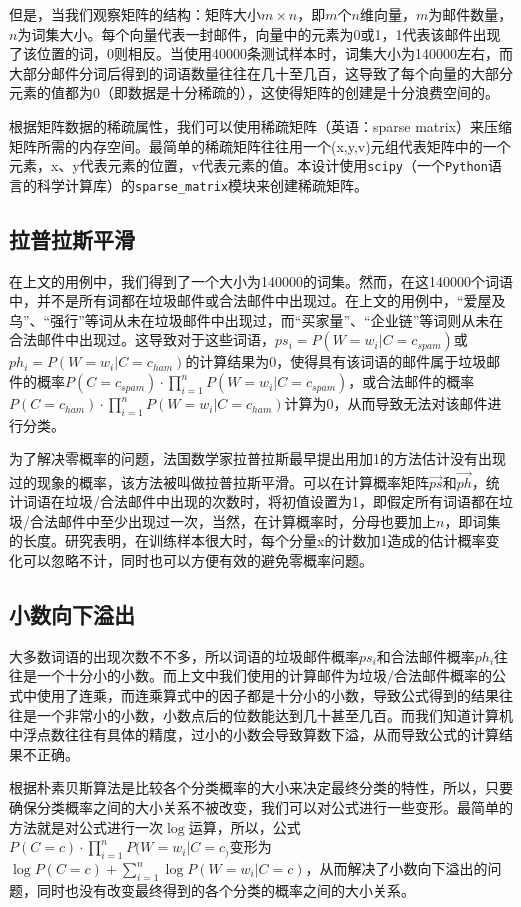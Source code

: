 \documentclass[UTF8,zihao=-4]{ctexart}
\newcommand{\upcite}[1]{\textsuperscript{\cite{#1}}}
\begin{document}
	但是，当我们观察矩阵的结构：矩阵大小$m\times n$，即$m$个$n$维向量，$m$为邮件数量，$n$为词集大小。每个向量代表一封邮件，向量中的元素为0或1，1代表该邮件出现了该位置的词，0则相反。当使用40000条测试样本时，词集大小为140000左右，而大部分邮件分词后得到的词语数量往往在几十至几百，这导致了每个向量的大部分元素的值都为0（即数据是十分稀疏的），这使得矩阵的创建是十分浪费空间的。
	
	根据矩阵数据的稀疏属性，我们可以使用稀疏矩阵（英语：sparse matrix）来压缩矩阵所需的内存空间。最简单的稀疏矩阵往往用一个(x,y,v)元组代表矩阵中的一个元素，x、y代表元素的位置，v代表元素的值。本设计使用\texttt{scipy}（一个\texttt{Python}语言的科学计算库）的\texttt{sparse\_matrix}模块来创建稀疏矩阵。
\subsection{拉普拉斯平滑}
	在上文的用例中，我们得到了一个大小为140000的词集。然而，在这140000个词语中，并不是所有词都在垃圾邮件或合法邮件中出现过。在上文的用例中，“爱屋及乌”、“强行”等词从未在垃圾邮件中出现过，而“买家量”、“企业链”等词则从未在合法邮件中出现过。这导致对于这些词语，$ps_i=P(W=w_i|C=c_{spam})$或$ph_i=P(W=w_i|C=c_{ham})$的计算结果为0，使得具有该词语的邮件属于垃圾邮件的概率$P(C=c_{spam}) \cdot \prod\limits_{i=1}^{n} P(W=w_i|C=c_{spam})$，或合法邮件的概率$P(C=c_{ham}) \cdot \prod\limits_{i=1}^{n} P(W=w_i|C=c_{ham})$计算为0，从而导致无法对该邮件进行分类。
	
	为了解决零概率的问题，法国数学家拉普拉斯最早提出用加1的方法估计没有出现过的现象的概率，该方法被叫做拉普拉斯平滑\upcite{nb-enhance}。可以在计算概率矩阵$\vec{ps}$和$\vec{ph}$，统计词语在垃圾/合法邮件中出现的次数时，将初值设置为1，即假定所有词语都在垃圾/合法邮件中至少出现过一次，当然，在计算概率时，分母也要加上$n$，即词集的长度。研究表明，在训练样本很大时，每个分量x的计数加1造成的估计概率变化可以忽略不计，同时也可以方便有效的避免零概率问题。
\subsection{小数向下溢出}
	大多数词语的出现次数不不多，所以词语的垃圾邮件概率$ps_i$和合法邮件概率$ph_i$往往是一个十分小的小数。而上文中我们使用的计算邮件为垃圾/合法邮件概率的公式中使用了连乘，而连乘算式中的因子都是十分小的小数，导致公式得到的结果往往是一个非常小的小数，小数点后的位数能达到几十甚至几百。而我们知道计算机中浮点数往往有具体的精度，过小的小数会导致算数下溢，从而导致公式的计算结果不正确。
	
	根据朴素贝斯算法是比较各个分类概率的大小来决定最终分类的特性，所以，只要确保分类概率之间的大小关系不被改变，我们可以对公式进行一些变形。最简单的方法就是对公式进行一次$\log$运算，所以，公式$P(C=c) \cdot \prod\limits_{i=1}^{n} P(W=w_i|C=c_)$变形为$\log P(C=c) + \sum\limits_{i=1}^{n}\log P(W=w_i|C=c)$，从而解决了小数向下溢出的问题，同时也没有改变最终得到的各个分类的概率之间的大小关系。
\end{document}
